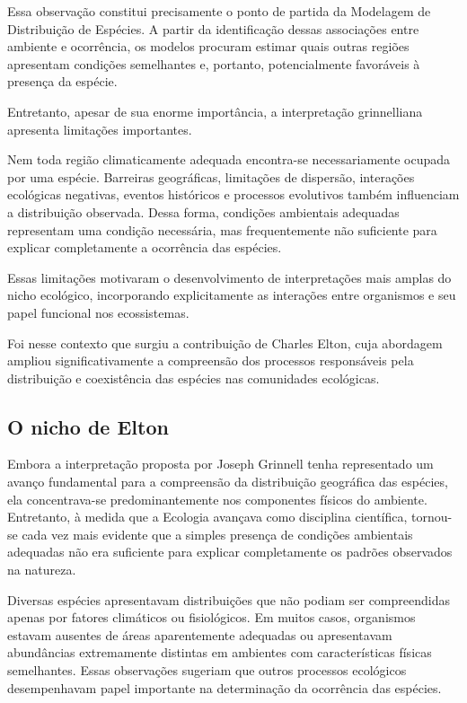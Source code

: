 Essa observação constitui precisamente o ponto de partida da Modelagem de Distribuição de Espécies. A partir da identificação dessas associações entre ambiente e ocorrência, os modelos procuram estimar quais outras regiões apresentam condições semelhantes e, portanto, potencialmente favoráveis à presença da espécie.

Entretanto, apesar de sua enorme importância, a interpretação grinnelliana apresenta limitações importantes.

Nem toda região climaticamente adequada encontra-se necessariamente ocupada por uma espécie. Barreiras geográficas, limitações de dispersão, interações ecológicas negativas, eventos históricos e processos evolutivos também influenciam a distribuição observada. Dessa forma, condições ambientais adequadas representam uma condição necessária, mas frequentemente não suficiente para explicar completamente a ocorrência das espécies.

Essas limitações motivaram o desenvolvimento de interpretações mais amplas do nicho ecológico, incorporando explicitamente as interações entre organismos e seu papel funcional nos ecossistemas.

Foi nesse contexto que surgiu a contribuição de Charles Elton, cuja abordagem ampliou significativamente a compreensão dos processos responsáveis pela distribuição e coexistência das espécies nas comunidades ecológicas.

\subsection{O nicho de Elton}

Embora a interpretação proposta por Joseph Grinnell tenha representado um avanço fundamental para a compreensão da distribuição geográfica das espécies, ela concentrava-se predominantemente nos componentes físicos do ambiente. Entretanto, à medida que a Ecologia avançava como disciplina científica, tornou-se cada vez mais evidente que a simples presença de condições ambientais adequadas não era suficiente para explicar completamente os padrões observados na natureza.

Diversas espécies apresentavam distribuições que não podiam ser compreendidas apenas por fatores climáticos ou fisiológicos. Em muitos casos, organismos estavam ausentes de áreas aparentemente adequadas ou apresentavam abundâncias extremamente distintas em ambientes com características físicas semelhantes. Essas observações sugeriam que outros processos ecológicos desempenhavam papel importante na determinação da ocorrência das espécies.

